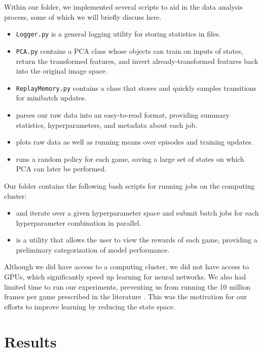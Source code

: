 \documentclass[11pt]{article}
\begin{document}
Within our  folder, we implemented several scripts to aid in the data analysis process, some of which we will briefly discuss here. 

\begin{itemize}
    \item \texttt{Logger.py} is a general logging utility for storing statistics in files. 
    \item \texttt{PCA.py} contains a PCA class whose objects can train on inputs of states, return the transformed features, and invert already-transformed features back into the original image space. 
    \item \texttt{ReplayMemory.py} contains a class that stores and quickly samples transitions for minibatch updates. 
    \item {} parses our raw data into an easy-to-read format, providing summary statistics, hyperparameters, and metadata about each job. 
    \item {} plots raw data as well as running means over episodes and training updates. 
    \item {} runs a random policy for each game, saving a large set of states on which PCA can later be performed. 
\end{itemize}
 
Our  folder contains the following bash scripts for running jobs on the computing cluster:

\begin{itemize}
    \item {} and  iterate over a given hyperparameter space and submit batch jobs for each hyperparameter combination in parallel.
    \item {} is a utility that allows the user to view the rewards of each game, providing a preliminary categorization of model performance. 
\end{itemize}

Although we did have access to a computing cluster, we did not have access to GPUs, which significantly speed up learning for neural networks. We also had limited time to run our experiments, preventing us from running the 10 million frames per game prescribed in the literature \cite{mnih2013playing, mnih2015human}. This was the motivation for our efforts to improve learning by reducing the state space.

\section{Results}
\end{document}
